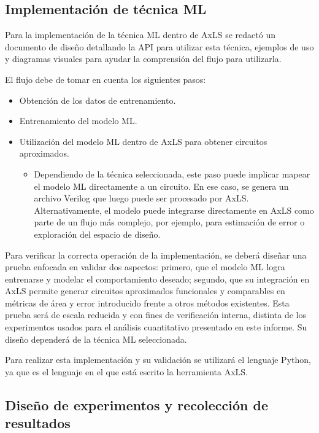 \subsection{Implementación de técnica ML}

Para la implementación de la técnica ML dentro de AxLS se redactó un documento
de diseño detallando la API para utilizar esta técnica, ejemplos de uso y
diagramas visuales para ayudar la comprensión del flujo para utilizarla.

El flujo debe de tomar en cuenta los siguientes pasos:

\begin{itemize}
  \item Obtención de los datos de entrenamiento.
  \item Entrenamiento del modelo ML.
  \item Utilización del modelo ML dentro de AxLS para obtener circuitos
    aproximados.
    \begin{itemize}
      \item Dependiendo de la técnica seleccionada, este paso puede implicar
        mapear el modelo ML directamente a un circuito. En ese caso, se genera un
        archivo Verilog que luego puede ser procesado por AxLS. Alternativamente,
        el modelo puede integrarse directamente en AxLS como parte de un flujo
        más complejo, por ejemplo, para estimación de error o exploración del
        espacio de diseño.
    \end{itemize}
\end{itemize}

Para verificar la correcta operación de la implementación, se deberá diseñar
una prueba enfocada en validar dos aspectos: primero, que el modelo ML logra
entrenarse y modelar el comportamiento deseado; segundo, que su integración en
AxLS permite generar circuitos aproximados funcionales y comparables en
métricas de área y error introducido frente a otros métodos existentes. Esta
prueba será de escala reducida y con fines de verificación interna, distinta de
los experimentos usados para el análisis cuantitativo presentado en este
informe. Su diseño dependerá de la técnica ML seleccionada.

Para realizar esta implementación y su validación se utilizará el lenguaje
Python, ya que es el lenguaje en el que está escrito la herramienta AxLS.

\subsection{Diseño de experimentos y recolección de resultados}

